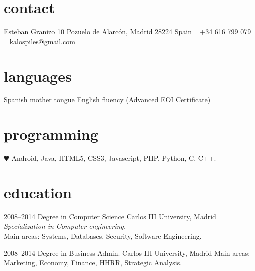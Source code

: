 \documentclass[]{friggeri-cv} %
\begin{document}


\begin{aside} %
\section{contact}
Esteban Granizo 10
Pozuelo de Alarcón, Madrid 28224
Spain
~
+34 616 799 079
~
\href{mailto:kalospiles@gmail.com}{kalospiles@gmail.com}
\section{languages}
Spanish mother tongue
English fluency (Advanced EOI Certificate)
\section{programming}
{\color{red} $\varheartsuit$} Android, Java,
HTML5, CSS3, Javascript, 
PHP, Python, C, C++.
\end{aside}


\section{education}

\begin{entrylist}
\entry
{2008--2014}
{Degree {\normalfont in Computer Science}}
{Carlos III University, Madrid}
{\emph{Specialization in Computer engineering.} \\
 Main areas: Systems, Databases, Security, Software Engineering.}

\entry
{2008--2014}
{Degree {\normalfont in Business Admin.}}
{Carlos III University, Madrid}
{Main areas: Marketing, Economy, Finance, HHRR, Strategic Analysis. }

\end{entrylist}
\end{document}
